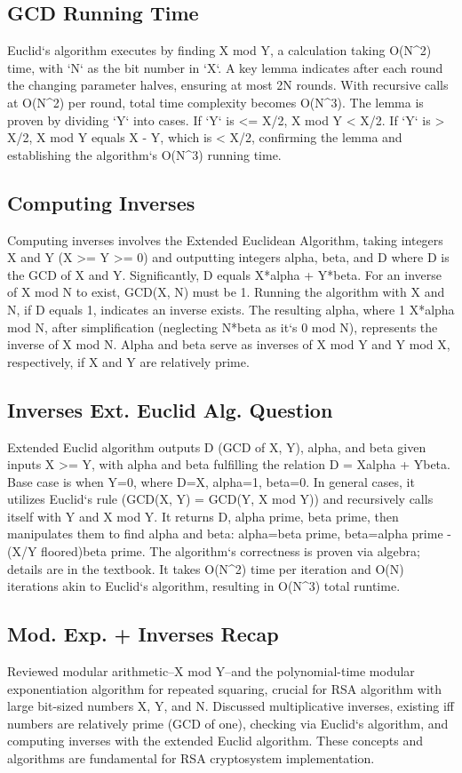 \subsection*{GCD  Running Time}
Euclid`s algorithm executes by finding X mod Y, a calculation taking O(N\textasciicircum{}2) time, with `N` as the bit number in `X`.
A key lemma indicates after each round the changing parameter halves, ensuring at most 2N rounds.
With recursive calls at O(N\textasciicircum{}2) per round, total time complexity becomes O(N\textasciicircum{}3).
The lemma is proven by dividing `Y` into cases.
If `Y` is \textless{}= X/2, X mod Y \textless{} X/2.
If `Y` is \textgreater{} X/2, X mod Y equals X - Y, which is \textless{} X/2, confirming the lemma and establishing the algorithm`s O(N\textasciicircum{}3) running time.

\subsection*{Computing Inverses}
Computing inverses involves the Extended Euclidean Algorithm, taking integers X and Y (X \textgreater{}= Y \textgreater{}= 0) and outputting integers alpha, beta, and D where D is the GCD of X and Y\@.
Significantly, D equals X*alpha + Y*beta.
For an inverse of X mod N to exist, GCD(X, N) must be 1.
Running the algorithm with X and N, if D equals 1, indicates an inverse exists.
The resulting alpha, where 1  X*alpha mod N, after simplification (neglecting N*beta as it`s 0 mod N), represents the inverse of X mod N\@.
Alpha and beta serve as inverses of X mod Y and Y mod X, respectively, if X and Y are relatively prime.

\subsection*{Inverses  Ext.
Euclid Alg.
Question}
Extended Euclid algorithm outputs D (GCD of X, Y), alpha, and beta given inputs X \textgreater{}= Y, with alpha and beta fulfilling the relation D = Xalpha + Ybeta.
Base case is when Y=0, where D=X, alpha=1, beta=0.
In general cases, it utilizes Euclid`s rule (GCD(X, Y) = GCD(Y, X mod Y)) and recursively calls itself with Y and X mod Y\@.
It returns D, alpha prime, beta prime, then manipulates them to find alpha and beta: alpha=beta prime, beta=alpha prime - (X/Y floored)beta prime.
The algorithm`s correctness is proven via algebra; details are in the textbook.
It takes O(N\textasciicircum{}2) time per iteration and O(N) iterations akin to Euclid`s algorithm, resulting in O(N\textasciicircum{}3) total runtime.

\subsection*{Mod.
Exp. + Inverses Recap}
Reviewed modular arithmetic--X mod Y--and the polynomial-time modular exponentiation algorithm for repeated squaring, crucial for RSA algorithm with large bit-sized numbers X, Y, and N\@.
Discussed multiplicative inverses, existing iff numbers are relatively prime (GCD of one), checking via Euclid`s algorithm, and computing inverses with the extended Euclid algorithm.
These concepts and algorithms are fundamental for RSA cryptosystem implementation.

